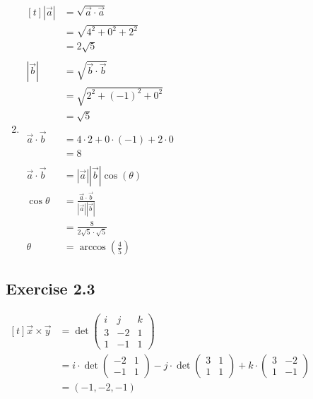 \documentclass[11pt,fleqn]{book} %
\begin{document}
\begin{minipage}[t]{0.45\linewidth}
    \begin{enumerate} \setcounter{enumi}{1}
        \item 
        $\begin{aligned}[t]
            | \vec{a} |           & = \sqrt{\vec{a} \cdot \vec{a}}                          \\
                                  & = \sqrt{4^2 + 0^2 + 2^2}                                \\
                                  & = 2\sqrt{5}
            \\ \\
            | \vec{b} |           & = \sqrt{\vec{b} \cdot \vec{b}}                          \\
                                  & = \sqrt{2^2 + (-1)^2 + 0^2}                             \\
                                  & = \sqrt{5}
            \\ \\
            \vec{a} \cdot \vec{b} & = 4 \cdot 2 + 0 \cdot (-1) + 2 \cdot 0                  \\
                                  & = 8
            \\ \\
            \vec{a} \cdot \vec{b} & = | \vec{a} | | \vec{b} | \cos(\theta)                  \\
            \cos \theta           & = \frac{\vec{a} \cdot \vec{b}}{| \vec{a} | | \vec{b} |} \\
                                  & = \frac{8}{2\sqrt{5} \cdot \sqrt{5}}                    \\
            \theta                & = \arccos \left( \frac{4}{5} \right)
        \end{aligned}$
    \end{enumerate}
\end{minipage}

\vfill
\subsection*{Exercise 2.3}

$\begin{aligned}[t]
    \vec{x} \times \vec{y} 
    & = \det \begin{pmatrix} i & j & k \\ 3 & -2 & 1 \\ 1 & -1 & 1 \end{pmatrix} \\
    & = i \cdot \det \begin{pmatrix} -2 & 1 \\ -1 & 1 \end{pmatrix} - j \cdot \det \begin{pmatrix} 3 & 1 \\ 1 & 1 \end{pmatrix} + k \cdot \begin{pmatrix} 3 & -2 \\ 1 & -1 \end{pmatrix} \\
    & = (-1, -2, -1)
\end{aligned}$
\end{document}
